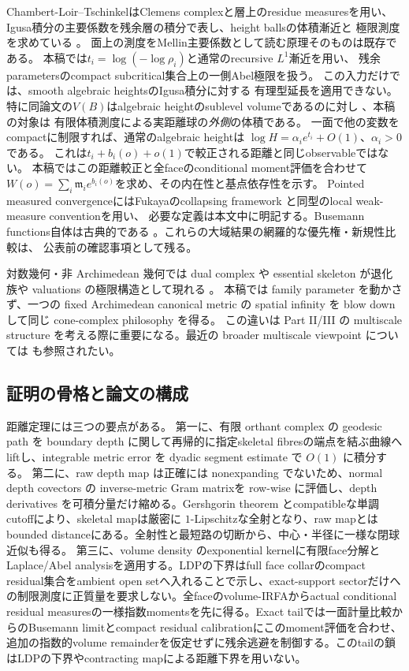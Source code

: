 \documentclass[11pt,a4paper]{ltjsarticle}
\theoremstyle{plain}
\theoremstyle{definition}
\theoremstyle{remark}
\begin{document}
Chambert-Loir--TschinkelはClemens complexと層上のresidue measuresを用い、
Igusa積分の主要係数を残余層の積分で表し、height ballsの体積漸近と
極限測度を求めている
\cite[\S\S2.1.12--13, 3.1.3, Propositions~4.2--4.3, Theorem~4.7 and Corollary~4.8]{ChambertLoirTschinkel}。
面上の測度をMellin主要係数として読む原理そのものは既存である。
本稿では$t_i=\log(-\log\rho_i)$と通常のrecursive $L^1$漸近を用い、
残余parametersのcompact subcritical集合上の一側Abel極限を扱う。
この入力だけでは、smooth algebraic heightsのIgusa積分に対する
有理型延長を適用できない。
特に同論文の$V(B)$はalgebraic heightのsublevel volumeであるのに対し
\cite[\S4.2, Theorem~4.7]{ChambertLoirTschinkel}、本稿の対象は
有限体積測度による実距離球の\emph{外側}の体積である。
一面で他の変数をcompactに制限すれば、通常のalgebraic heightは
$\log H=\alpha_i e^{t_i}+O(1)$、$\alpha_i>0$である。
これは$t_i+b_i(o)+o(1)$で較正される距離と同じobservableではない。
本稿ではこの距離較正と全faceのconditional moment評価を合わせて
$W(o)=\sum_i\mathfrak m_i e^{b_i(o)}$を求め、その内在性と基点依存性を示す。
Pointed measured convergenceにはFukayaのcollapsing framework
\cite{Fukaya}と同型のlocal weak-measure conventionを用い、
必要な定義は本文中に明記する。Busemann functions自体は古典的である
\cite{Busemann}。これらの大域結果の網羅的な優先権・新規性比較は、
公表前の確認事項として残る。

対数幾何・非 Archimedean 幾何では dual complex や essential skeleton が退化族や valuations の極限構造として現れる \cite{NicaiseXu,BoucksomJonsson}。
本稿では family parameter を動かさず、一つの fixed Archimedean canonical metric の spatial infinity を blow down して同じ cone-complex philosophy を得る。
この違いは Part II/III の multiscale structure を考える際に重要になる。最近の broader multiscale viewpoint については \cite{Spotti} も参照されたい。

\subsection{証明の骨格と論文の構成}
距離定理には三つの要点がある。
第一に、有限 orthant complex の geodesic path を boundary depth に関して再帰的に指定skeletal fibresの端点を結ぶ曲線へ liftし、integrable metric error を dyadic segment estimate で $O(1)$ に積分する。
第二に、raw depth map は正確には nonexpanding でないため、normal depth covectors の inverse-metric Gram matrixを row-wise に評価し、depth derivatives を可積分量だけ縮める。Gershgorin theorem とcompatibleな単調cutoffにより、skeletal mapは厳密に $1$-Lipschitzな全射となり、raw mapとはbounded distanceにある。全射性と最短路の切断から、中心・半径に一様な閉球近似も得る。
第三に、volume density のexponential kernelに有限face分解とLaplace/Abel analysisを適用する。LDPの下界はfull face collarのcompact residual集合をambient open setへ入れることで示し、exact-support sectorだけへの制限測度に正質量を要求しない。全faceのvolume-IRFAからactual conditional residual measuresの一様指数momentsを先に得る。Exact tailでは一面計量比較からのBusemann limitとcompact residual calibrationにこのmoment評価を合わせ、追加の指数的volume remainderを仮定せずに残余逃避を制御する。このtailの鎖はLDPの下界やcontracting mapによる距離下界を用いない。
\end{document}
